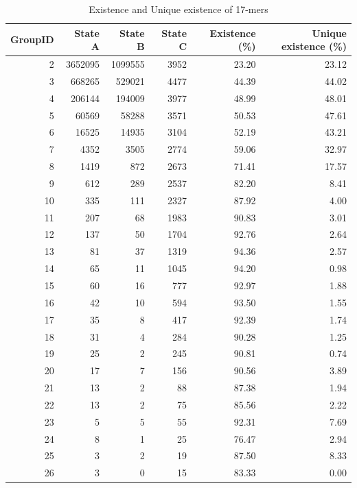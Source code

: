 \documentclass[11pt]{article}
\begin{document}
\begin{longtable}{r|r|r|r|r|r} 
\caption{Existence and Unique existence of 17-mers}\\
\toprule
\textbf{GroupID} & \textbf{State A} & \textbf{State B} & \textbf{State C} & \textbf{Existence (\%)} & \textbf{Unique existence (\%)}\\
\midrule
\endhead
    2     & 3652095 & 1099555 & 3952  & 23.20 & 23.12 \\
    3     & 668265 & 529021 & 4477  & 44.39 & 44.02 \\
    4     & 206144 & 194009 & 3977  & 48.99 & 48.01 \\
    5     & 60569 & 58288 & 3571  & 50.53 & 47.61 \\
    6     & 16525 & 14935 & 3104  & 52.19 & 43.21 \\
    7     & 4352  & 3505  & 2774  & 59.06 & 32.97 \\
    8     & 1419  & 872   & 2673  & 71.41 & 17.57 \\
    9     & 612   & 289   & 2537  & 82.20 & 8.41 \\
    10    & 335   & 111   & 2327  & 87.92 & 4.00 \\
    11    & 207   & 68    & 1983  & 90.83 & 3.01 \\
    12    & 137   & 50    & 1704  & 92.76 & 2.64 \\
    13    & 81    & 37    & 1319  & 94.36 & 2.57 \\
    14    & 65    & 11    & 1045  & 94.20 & 0.98 \\
    15    & 60    & 16    & 777   & 92.97 & 1.88 \\
    16    & 42    & 10    & 594   & 93.50 & 1.55 \\
    17    & 35    & 8     & 417   & 92.39 & 1.74 \\
    18    & 31    & 4     & 284   & 90.28 & 1.25 \\
    19    & 25    & 2     & 245   & 90.81 & 0.74 \\
    20    & 17    & 7     & 156   & 90.56 & 3.89 \\
    21    & 13    & 2     & 88    & 87.38 & 1.94 \\
    22    & 13    & 2     & 75    & 85.56 & 2.22 \\
    23    & 5     & 5     & 55    & 92.31 & 7.69 \\
    24    & 8     & 1     & 25    & 76.47 & 2.94 \\
    25    & 3     & 2     & 19    & 87.50 & 8.33 \\
    26    & 3     & 0     & 15    & 83.33 & 0.00 \\

\end{longtable}
\end{document}
